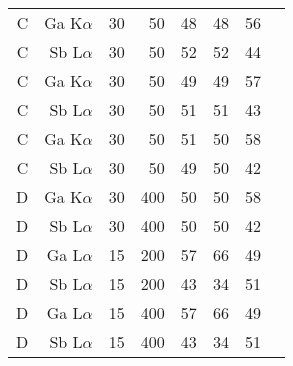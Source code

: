 \begin{table}[phtb]
\begin{center}
\begin{tabular}{rrrrrrrr}
            \hline
            C               & Ga K$\alpha$  & 30             & 50             & 48                          & 48                                 & 56                           \\
            C               & Sb L$\alpha$  & 30             & 50             & 52                          & 52                                 & 44                           \\
            C               & Ga K$\alpha$  & 30             & 50             & 49                          & 49                                 & 57                           \\
            C               & Sb L$\alpha$  & 30             & 50             & 51                          & 51                                 & 43                           \\
            C               & Ga K$\alpha$  & 30             & 50             & 51                          & 50                                 & 58                           \\
            C               & Sb L$\alpha$  & 30             & 50             & 49                          & 50                                 & 42                           \\
            \hline
            D               & Ga K$\alpha$  & 30             & 400            & 50                          & 50                                 & 58                           \\
            D               & Sb L$\alpha$  & 30             & 400            & 50                          & 50                                 & 42                           \\
            D               & Ga L$\alpha$  & 15             & 200            & 57                          & 66                                 & 49                           \\
            D               & Sb L$\alpha$  & 15             & 200            & 43                          & 34                                 & 51                           \\
            D               & Ga L$\alpha$  & 15             & 400            & 57                          & 66                                 & 49                           \\
            D               & Sb L$\alpha$  & 15             & 400            & 43                          & 34                                 & 51                           \\
            \hline
        \end{tabular}
    \end{center}
\end{table}
\restoregeometry %
